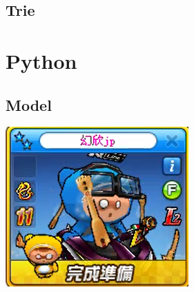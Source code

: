     \subsection{Trie}
        

\section{Python}
    \subsection{Model}
        
\includegraphics{Contents/runrun.png}